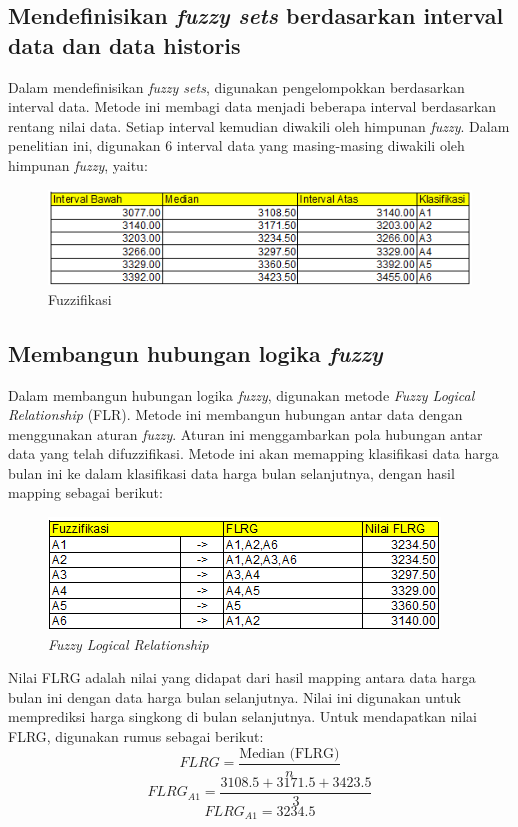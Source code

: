 \documentclass[conference]{IEEEtran}
\begin{document}
\subsection{Mendefinisikan \textit{fuzzy sets} berdasarkan interval data dan data historis}
Dalam mendefinisikan \textit{fuzzy sets}, digunakan pengelompokkan berdasarkan interval data. Metode ini membagi data menjadi beberapa interval berdasarkan rentang nilai data. Setiap interval kemudian diwakili oleh himpunan \textit{fuzzy}. Dalam penelitian ini, digunakan 6 interval data yang masing-masing diwakili oleh himpunan \textit{fuzzy}, yaitu:
\begin{figure}[H]
    \centering
    \includegraphics[width=\columnwidth]{images/Fuzzifikasi.png} 
    \caption{Fuzzifikasi}
\end{figure}

\subsection{Membangun hubungan logika \textit{fuzzy}}
Dalam membangun hubungan logika \textit{fuzzy}, digunakan metode \textit{Fuzzy Logical Relationship} (FLR). Metode ini membangun hubungan antar data dengan menggunakan aturan \textit{fuzzy}. Aturan ini menggambarkan pola hubungan antar data yang telah difuzzifikasi. Metode ini akan memapping klasifikasi data harga bulan ini ke dalam klasifikasi data harga bulan selanjutnya, dengan hasil mapping sebagai berikut:
\begin{figure}[H]
    \centering
    \includegraphics[scale=0.7]{images/FLR.png} 
    \caption{\textit{Fuzzy Logical Relationship}}
\end{figure}
Nilai FLRG adalah nilai yang didapat dari hasil mapping antara data harga bulan ini dengan data harga bulan selanjutnya. Nilai ini digunakan untuk memprediksi harga singkong di bulan selanjutnya.
Untuk mendapatkan nilai FLRG, digunakan rumus sebagai berikut:
    \begin{equation}
        FLRG = \frac{\text{Median (FLRG)}}{n}
    \end{equation}
    \begin{equation*}
        FLRG_{A1} = \frac{3108.5 + 3171.5 + 3423.5}{3}
    \end{equation*}
    \begin{equation*}
        FLRG_{A1} = 3234.5
    \end{equation*}
   
\end{document}
